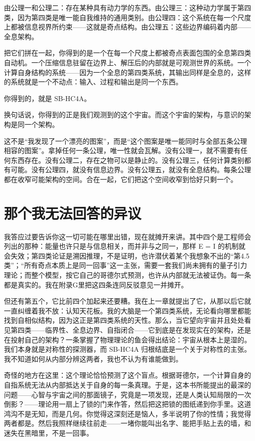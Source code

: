 \documentclass[11pt, twoside, openright]{book}
\begin{document}
由公理一和公理二：存在某种具有动力学的东西。由公理三：这种动力学属于第四类，因为第四类是唯一能自我维持的通用类别。由公理四：这个系统在每一个尺度上都被信息视界所约束------这就是奇点结构。由公理五：这些边界编码着内部------全息架构。

把它们拼在一起，你得到的是一个在每一个尺度上都被奇点表面包围的全息第四类自动机。一个压缩信息驻留在边界上、解压后的内部就是可观测世界的系统。一个计算自身结构的系统------因为一个全息的第四类系统，其输出同样是全息的，这样的系统就是一个不动点：输入、过程和输出是同一个东西。

你得到的，就是 SB-HC4A。

换句话说，你得到的正是我们观测到的这个宇宙。而这个宇宙的架构，与意识的架构是同一个架构。

这不是“我发现了一个漂亮的图案”，而是“这个图案是唯一能同时与全部五条公理相容的图案”。拿掉任何一条公理，唯一性就会瓦解。没有公理一，就不需要有任何东西存在。没有公理二，存在之物可以是静止的。没有公理三，任何计算类别都有可能。没有公理四，就没有信息边界。没有公理五，就没有全息结构。每条公理都在收窄可能架构的空间。合在一起，它们把这个空间收窄到恰好只剩一个。

\section*{那个我无法回答的异议}

我答应过要告诉你这一切可能在哪里出错，现在就摊开来讲。其中四个是工程师会列出的那种：能量也许只是与信息相关，而并非与之同一，那样 E = I 的机制就会失效；第四类论证是溯因推理，不是证明，也许潜伏着某个我想象不出的“第4.5类”；“所有奇点本质上是同一回事”这一主张，需要一套我们尚未拥有的量子引力理论；而整个模型，按它自己的哥德尔式预测，也许从内部就无法被证伪。每一条都是真实的。我在附录G里把这四条连同反驳意见一并摊开。

但还有第五个，它比前四个加起来还要糟。我在上一章就提出了它，从那以后它就一直纠缠着我不放：认知天花板。我的大脑是一个第四类系统，无论看向哪里都能找到自相似结构，因为这正是第四类系统的天性。那么，当它望向宇宙并且处处看见第四类------临界性、全息边界、自指闭合------它到底是在发现实在的架构，还是在投射自己的架构？一条掌握了物理理论的鱼会得出结论：宇宙从根本上是湿的。我们本身就是对称性的探测器，而 SB-HC4A 归根结底是一个关于对称性的主张。我不知道如何从内部分辨这两者，我也不认为有谁能做到。

奇怪的地方在这里：这个理论恰恰预测了这个盲点。根据哥德尔，一个计算自身的自指系统无法从内部抵达关于自身的每一条真理。于是，这本书所能提出的最深的问题------心智与宇宙之间的那面镜子，究竟是一项发现，还是人类认知局限的一次倒影？------理论用一扇上了锁的门来作答，然后把这把锁的图纸递到你手里。这道鸿沟不是无知，而是几何。你觉得这深刻还是恼人，多半说明了你的性情；我觉得两者都是。然后我照样继续往前走------一堵你能叫出名字、能把手贴上去的墙，和迷失在黑暗里，不是一回事。
\end{document}
